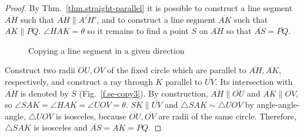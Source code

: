 \begin{proof}
By Thm.~\ref{thm.straight-parallel} it is possible to construct a line segment $\overline{AH}$ such that $\overline{AH}\|\overline{A'H'}$, and to construct a line segment $\overline{AK}$ such that $\overline{AK}\|\overline{PQ}$.
$\angle HAK=\theta$ so it remains to find a point $S$ on $\overline{AH}$ so that $\overline{AS}=\overline{PQ}$.

\begin{figure}[b]
\begin{center}
\end{center}
\caption{Copying a line segment in a given direction}\label{f.se-copy1}
\end{figure}

Construct two radii $\overline{OU}, \overline{OV}$ of the fixed circle which are parallel to $\overline{AH}, \overline{AK}$, respectively, and construct a ray through $K$ parallel to $\overline{UV}$. Its intersection with $\overline{AH}$ is denoted by $S$ (Fig.~\ref{f.se-copy3}).
By construction, $\overline{AH}\|\overline{OU}$ and $\overline{AK}\|\overline{OV}$, so $\angle SAK=\angle HAK=\angle UOV=\theta$. $\overline{SK}\|\overline{UV}$ and $\triangle SAK\sim\triangle UOV$ by angle-angle-angle, $\triangle UOV$ is isosceles, because $\overline{OU}, \overline{OV}$ are radii of the same circle. Therefore, $\triangle SAK$ is isosceles and $\overline{AS}=\overline{AK}=\overline{PQ}$.
\end{proof}


